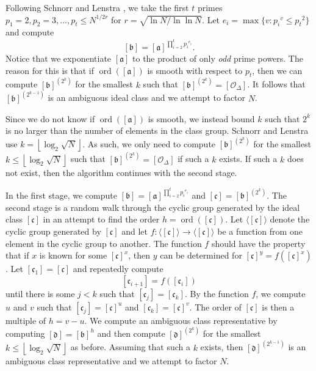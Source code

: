 \documentclass{ucalgthes1}
\theoremstyle{definition}
\DeclareMathOperator{\ord}{ord}
\newcommand{\floor}[1]{\left\lfloor #1 \right\rfloor}
\newcommand{\ideal}{\mathfrak}
\newcommand{\idealclass}[1]{\left[ \ideal #1 \right]}
\newcommand{\aclass}{\idealclass a}
\newcommand{\bclass}{\idealclass b}
\newcommand{\cclass}{\idealclass c}
\newcommand{\dclass}{\idealclass d}
\newcommand{\idclass}{[\mathcal O_\Delta]}
\begin{document}
Following Schnorr and Lenstra \cite{Schnorr1984}, we take the first $t$ primes $p_1 = 2, p_2 = 3, ..., p_t \le N^{1/2r}$ for $r = \sqrt{\ln N / \ln \ln N}$.  Let $e_i = \max \{ v : {p_i}^v \le {p_t}^2 \}$ and compute
\[
	\bclass = \aclass^{\prod_{i=2}^t {p_i}^{e_i}}.
\]
Notice that we exponentiate $\aclass$ to the product of only \emph{odd} prime powers.  The reason for this is that if $\ord(\aclass)$ is smooth with respect to $p_t$, then we can compute $\bclass^{\left(2^k\right)}$ for the smallest $k$ such that $\bclass^{\left(2^k\right)} = \idclass$.  It follows that $\bclass^{\left(2^{k-1}\right)}$ is an ambiguous ideal class and we attempt to factor $N$.

Since we do not know if $\ord(\aclass)$ is smooth, we instead bound $k$ such that $2^k$ is no larger than the number of elements in the class group.  Schnorr and Lenstra \cite[p.291]{Schnorr1984} use $k = \floor{\log_2{\sqrt N}}$.  As such, we only need to compute $\bclass^{\left(2^k\right)}$ for the smallest $k \le \floor{\log_2{\sqrt N}}$ such that $\bclass^{\left(2^k\right)} = \idclass$ if such a $k$ exists. If such a $k$ does not exist, then the algorithm continues with the second stage.

In the first stage, we compute $\bclass = \aclass^{\prod_{i=2}^t {p_i}^{e_i}}$ and $\cclass = \bclass^{\left(2^k\right)}$.  The second stage is a random walk through the cyclic group generated by the ideal class $\cclass$ in an attempt to find the order $h = \ord(\cclass)$.  Let $\langle \cclass \rangle$ denote the cyclic group generated by $\cclass$ and let $f : \langle \cclass \rangle \rightarrow \langle \cclass \rangle$ be a function from one element in the cyclic group to another.  The function $f$ should have the property that if $x$ is known for some $\cclass ^x$, then $y$ can be determined for $\cclass^y = f(\cclass^x)$.  Let $[\mathfrak c_1] = \cclass$ and repeatedly compute
\[
	[\mathfrak c_{i+1}] = f([\mathfrak c_i])
\]
until there is some $j < k$ such that $[\mathfrak c_j] = [\mathfrak c_k]$.  By the function $f$, we compute $u$ and $v$ such that $[\mathfrak c_j]=\cclass^u$ and $[\mathfrak c_k]=\cclass^v$.  The order of $\cclass$ is then a multiple of $h = v - u$.  We compute an ambiguous class representative by computing $\dclass = \bclass^h$ and then compute $\dclass^{\left(2^k\right)}$ for the smallest $k \le \floor{\log_2{\sqrt N}}$ as before.  Assuming that such a $k$ exists, then $\dclass^{\left(2^{k-1}\right)}$ is an ambiguous class representative and we attempt to factor $N$.
\end{document}
